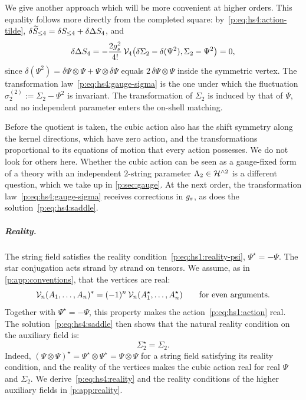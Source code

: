 We give another approach which will be more convenient at higher orders.
This equality follows more directly from the completed square: by~\eqref{p:eq:hs4:action-tilde}, $\delta \caction[\le 4] = \delta S_{\le 4} + \delta \Delta S_4$, and
\begin{equation}
  \label{p:eq:hs4:delta-DeltaS}
  \delta \Delta S_4
    = - \frac{2 \gs^2}{4!} \, \vertex{4}\big(\delta \Sigma_2 - \delta (\Psi^2), \Sigma_2 - \Psi^2\big)
    = 0,
\end{equation}
since $\delta (\Psi^2) = \delta \Psi \otimes \Psi + \Psi \otimes \delta \Psi$ equals $2 \, \delta \Psi \otimes \Psi$ inside the symmetric vertex.
The transformation law~\eqref{p:eq:hs4:gauge-sigma} is the one under which the fluctuation $\sigma_2^{(2)} := \Sigma_2 - \Psi^2$ is invariant.
The transformation of $\Sigma_2$ is induced by that of $\Psi$, and no independent parameter enters the on-shell matching.

Before the quotient is taken, the cubic action also has the shift symmetry along the kernel directions, which have zero action, and the transformations proportional to its equations of motion that every action possesses.
We do not look for others here.
Whether the cubic action can be seen as a gauge-fixed form of a theory with an independent $2$-string parameter $\Lambda_2 \in \Hn{2}$ is a different question, which we take up in \cref{p:sec:gauge}.
At the next order, the transformation law~\eqref{p:eq:hs4:gauge-sigma} receives corrections in $\gs$, as does the solution~\eqref{p:eq:hs4:saddle}.


\subparagraph{Reality.}

The string field satisfies the reality condition~\eqref{p:eq:hs1:reality-psi}, $\Psi^\star = - \Psi$.
The star conjugation acts strand by strand on tensors.
We assume, as in \cref{p:app:conventions}, that the vertices are real:
\begin{equation}
  \label{p:eq:hs4:vertex-real}
  \vertex{n}(A_1, \ldots, A_n)^*
    = (-1)^n \, \vertex{n}(A_1^\star, \ldots, A_n^\star)
  \qquad
  \text{for even arguments}.
\end{equation}
Together with $\Psi^\star = - \Psi$, this property makes the action~\eqref{p:eq:hs1:action} real.
The solution~\eqref{p:eq:hs4:saddle} then shows that the natural reality condition on the auxiliary field is:
\begin{equation}
  \label{p:eq:hs4:reality}
  \Sigma_2^\star
    = \Sigma_2.
\end{equation}
Indeed, $(\Psi \otimes \Psi)^\star = \Psi^\star \otimes \Psi^\star = \Psi \otimes \Psi$ for a string field satisfying its reality condition, and the reality of the vertices makes the cubic action real for real $\Psi$ and $\Sigma_2$.
We derive~\eqref{p:eq:hs4:reality} and the reality conditions of the higher auxiliary fields in \cref{p:app:reality}.


